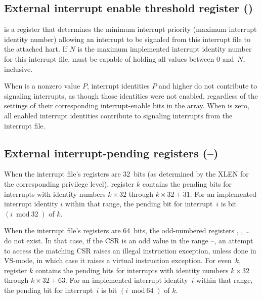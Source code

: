 \subsection{External interrupt enable threshold register ()}

 is a {\WLRL} register that determines the minimum
interrupt priority (maximum interrupt identity number) allowing an
interrupt to be signaled from this interrupt file to the attached hart.
If $N$ is the maximum implemented interrupt identity number for this
interrupt file,  must be capable of holding all values
between 0 and~$N$, inclusive.

When  is a nonzero value $P$, interrupt identities $P$
and higher do not contribute to signaling interrupts, as though those
identities were not enabled, regardless of the settings of their
corresponding interrupt-enable bits in the  array.
When  is zero, all enabled interrupt identities
contribute to signaling interrupts from the interrupt file.

\subsection{External interrupt-pending registers (--)}

When the interrupt file's registers are 32~bits (as determined by
the XLEN for the corresponding privilege level), register $k$
contains the pending bits for interrupts with identity numbers
$k\times\mbox{32}$ through ${k\times\mbox{32} + \mbox{31}}$.
For an implemented interrupt identity $i$ within that range, the
pending bit for interrupt~$i$ is bit $(i\bmod\mbox{32})$ of $k$.

When the interrupt file's registers are 64~bits, the odd-numbered
registers , , \dots {} do not exist.
In that case, if the  CSR is an odd value in the range
--, an attempt to access the matching  CSR
raises an illegal instruction exception, unless done in VS-mode, in
which case it raises a virtual instruction exception.
For even~$k$, register $k$ contains the pending bits
for interrupts with identity numbers $k\times\mbox{32}$ through
${k\times\mbox{32} + \mbox{63}}$.
For an implemented interrupt identity~$i$ within that range, the
pending bit for interrupt~$i$ is bit $(i\bmod\mbox{64})$ of $k$.

